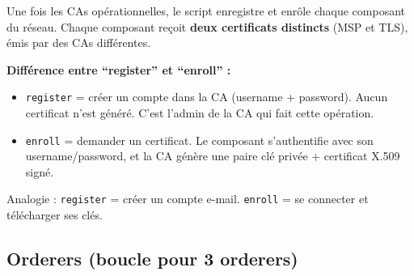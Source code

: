 \documentclass[12pt,a4paper,twoside]{report}
\begin{document}
Une fois les CAs opérationnelles, le script enregistre et enrôle chaque composant du réseau. Chaque composant reçoit \textbf{deux certificats distincts} (MSP et TLS), émis par des CAs différentes.

\begin{infobox}
\textbf{Différence entre ``register'' et ``enroll'' :}
\begin{itemize}
    \item \texttt{register} = créer un compte dans la CA (username + password). Aucun certificat n'est généré. C'est l'admin de la CA qui fait cette opération.
    \item \texttt{enroll} = demander un certificat. Le composant s'authentifie avec son username/password, et la CA génère une paire clé privée + certificat X.509 signé.
\end{itemize}
Analogie : \texttt{register} = créer un compte e-mail. \texttt{enroll} = se connecter et télécharger ses clés.
\end{infobox}

\subsection{Orderers (boucle pour 3 orderers)}
\end{document}

